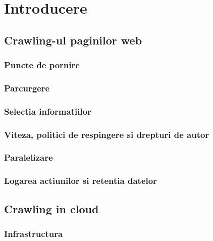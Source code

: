 \documentclass[12pt,oneside]{report}
\newcommand{\chaptertitle}[1]{\LARGE{#1}}
\begin{document}

\tableofcontents
\clearpage

\chapter*{\chaptertitle{Introducere}}

\clearpage

\section{Crawling-ul paginilor web}


\subsection{Puncte de pornire}


\subsection{Parcurgere}


\subsection{Selectia informatiilor}


\subsection{Viteza, politici de respingere si drepturi de autor}


\subsection{Paralelizare}


\subsection{Logarea actiunilor si retentia datelor}

\clearpage

\section{Crawling in cloud}

\clearpage

\subsection{Infrastructura}



\end{document}
